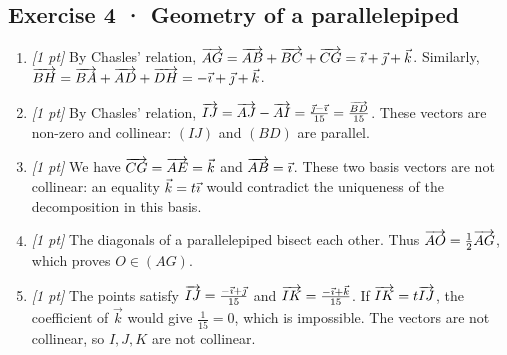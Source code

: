 \subsection*{Exercise 4 · Geometry of a parallelepiped}\begin{enumerate}

\item \textit{[1 pt]} By Chasles' relation, $\overrightarrow{AG}=\overrightarrow{AB}+\overrightarrow{BC}+\overrightarrow{CG}=\vec{\imath} +\vec{\jmath} +\vec k$. Similarly, $\overrightarrow{BH}=\overrightarrow{BA}+\overrightarrow{AD}+\overrightarrow{DH}=-\vec{\imath} +\vec{\jmath} +\vec k$.

\item \textit{[1 pt]} By Chasles' relation, $\overrightarrow{IJ}=\overrightarrow{AJ}-\overrightarrow{AI}=\frac{\vec{\jmath} -\vec{\imath} }{15}=\frac{\overrightarrow{BD}}{15}$. These vectors are non-zero and collinear: $(IJ)$ and $(BD)$ are parallel.

\item \textit{[1 pt]} We have $\overrightarrow{CG}=\overrightarrow{AE}=\vec k$ and $\overrightarrow{AB}=\vec{\imath} $. These two basis vectors are not collinear: an equality $\vec k=t\vec{\imath} $ would contradict the uniqueness of the decomposition in this basis.

\item \textit{[1 pt]} The diagonals of a parallelepiped bisect each other. Thus $\overrightarrow{AO}=\frac12\overrightarrow{AG}$, which proves $O\in(AG)$.

\item \textit{[1 pt]} The points satisfy $\overrightarrow{IJ}=\frac{-\vec{\imath} +\vec{\jmath} }{15}$ and $\overrightarrow{IK}=\frac{-\vec{\imath} +\vec k}{15}$. If $\overrightarrow{IK}=t\overrightarrow{IJ}$, the coefficient of $\vec k$ would give $\frac{1}{15}=0$, which is impossible. The vectors are not collinear, so $I,J,K$ are not collinear.

\end{enumerate}

\fi

\fi


